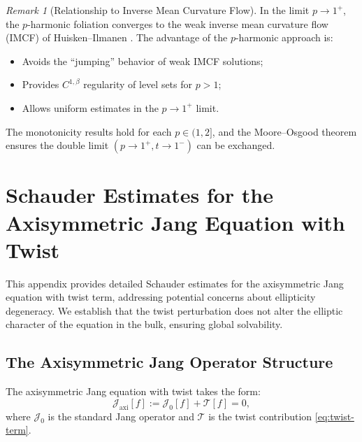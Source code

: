 \documentclass[12pt]{article}
\theoremstyle{plain}
\theoremstyle{definition}
\theoremstyle{remark}
\newtheorem{remark}[theorem]{Remark}
\newcommand{\Hoelder}{\beta}
\begin{document}
\begin{remark}[Relationship to Inverse Mean Curvature Flow]
In the limit $p \to 1^+$, the $p$-harmonic foliation converges to the weak inverse mean curvature flow (IMCF) of Huisken--Ilmanen \cite{huisken2001}. The advantage of the $p$-harmonic approach is:
\begin{itemize}
    \item Avoids the ``jumping'' behavior of weak IMCF solutions;
    \item Provides $C^{1,\Hoelder}$ regularity of level sets for $p > 1$;
    \item Allows uniform estimates in the $p \to 1^+$ limit.
\end{itemize}
The monotonicity results hold for each $p \in (1,2]$, and the Moore--Osgood theorem ensures the double limit $(p \to 1^+, t \to 1^-)$ can be exchanged.
\end{remark}


\section{Schauder Estimates for the Axisymmetric Jang Equation with Twist}\label{app:schauder}

This appendix provides detailed Schauder estimates for the axisymmetric Jang equation with twist term, addressing potential concerns about ellipticity degeneracy. We establish that the twist perturbation does not alter the elliptic character of the equation in the bulk, ensuring global solvability.

\subsection{The Axisymmetric Jang Operator Structure}

The axisymmetric Jang equation with twist takes the form:
\begin{equation}\label{eq:axi-jang-full}
\mathcal{J}_{\mathrm{axi}}[f] := \mathcal{J}_0[f] + \mathcal{T}[f] = 0,
\end{equation}
where $\mathcal{J}_0$ is the standard Jang operator and $\mathcal{T}$ is the twist contribution \eqref{eq:twist-term}.
\end{document}
